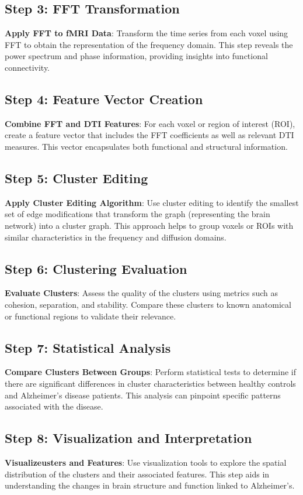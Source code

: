 \documentclass[twocolumn]{article}
\begin{document}
\subsection{ Step 3: FFT Transformation}
\textbf{Apply FFT to fMRI Data}: Transform the time series from each voxel using FFT to obtain the representation of the frequency domain. This step reveals
the power spectrum and phase information, providing insights into functional connectivity.

\subsection{ Step 4: Feature Vector Creation}
\textbf{Combine FFT and DTI Features}: For each voxel or region of interest (ROI), create a feature vector that includes the FFT coefficients as well as relevant DTI measures. This vector encapsulates both functional and structural information.

\subsection{ Step 5: Cluster Editing}
\textbf{Apply Cluster Editing Algorithm}: Use cluster editing to identify the smallest set of edge modifications that transform the graph (representing
the brain network) into a cluster graph. This approach helps to group voxels or ROIs with similar characteristics in the frequency and diffusion
domains.

\subsection{ Step 6: Clustering Evaluation}
\textbf{Evaluate Clusters}: Assess the quality of the clusters using metrics such as cohesion, separation, and stability. Compare these clusters to
known anatomical or functional regions to validate their relevance.

\subsection{ Step 7: Statistical Analysis}
\textbf{Compare Clusters Between Groups}: Perform statistical tests to determine if there are significant differences in cluster characteristics
between healthy controls and Alzheimer's disease patients. This analysis can pinpoint specific patterns associated with the disease.

\subsection{ Step 8: Visualization and Interpretation}
\textbf{Visualizeusters and Features}: Use visualization tools to explore the spatial distribution of the clusters and their associated features. This
step aids in understanding the changes in brain structure and function linked to Alzheimer's.
\end{document}
